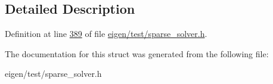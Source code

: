 \subsection{Detailed Description}


Definition at line \hyperlink{eigen_2test_2sparse__solver_8h_source_l00389}{389} of file \hyperlink{eigen_2test_2sparse__solver_8h_source}{eigen/test/sparse\+\_\+solver.\+h}.



The documentation for this struct was generated from the following file\+:\begin{DoxyCompactItemize}
\item 
eigen/test/sparse\+\_\+solver.\+h\end{DoxyCompactItemize}
